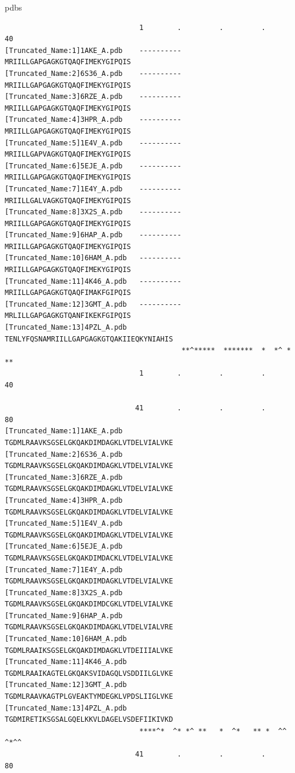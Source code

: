 \documentclass[
  letterpaper,
  DIV=11,
  numbers=noendperiod]{scrartcl}
\newenvironment{Shaded}{\begin{snugshade}}{\end{snugshade}}
\newcommand{\NormalTok}[1]{\textcolor[rgb]{0.00,0.23,0.31}{#1}}
\begin{document}
\begin{Shaded}
\begin{Highlighting}[]
\NormalTok{pdbs}
\end{Highlighting}
\end{Shaded}

\begin{verbatim}
                                1        .         .         .         40 
[Truncated_Name:1]1AKE_A.pdb    ----------MRIILLGAPGAGKGTQAQFIMEKYGIPQIS
[Truncated_Name:2]6S36_A.pdb    ----------MRIILLGAPGAGKGTQAQFIMEKYGIPQIS
[Truncated_Name:3]6RZE_A.pdb    ----------MRIILLGAPGAGKGTQAQFIMEKYGIPQIS
[Truncated_Name:4]3HPR_A.pdb    ----------MRIILLGAPGAGKGTQAQFIMEKYGIPQIS
[Truncated_Name:5]1E4V_A.pdb    ----------MRIILLGAPVAGKGTQAQFIMEKYGIPQIS
[Truncated_Name:6]5EJE_A.pdb    ----------MRIILLGAPGAGKGTQAQFIMEKYGIPQIS
[Truncated_Name:7]1E4Y_A.pdb    ----------MRIILLGALVAGKGTQAQFIMEKYGIPQIS
[Truncated_Name:8]3X2S_A.pdb    ----------MRIILLGAPGAGKGTQAQFIMEKYGIPQIS
[Truncated_Name:9]6HAP_A.pdb    ----------MRIILLGAPGAGKGTQAQFIMEKYGIPQIS
[Truncated_Name:10]6HAM_A.pdb   ----------MRIILLGAPGAGKGTQAQFIMEKYGIPQIS
[Truncated_Name:11]4K46_A.pdb   ----------MRIILLGAPGAGKGTQAQFIMAKFGIPQIS
[Truncated_Name:12]3GMT_A.pdb   ----------MRLILLGAPGAGKGTQANFIKEKFGIPQIS
[Truncated_Name:13]4PZL_A.pdb   TENLYFQSNAMRIILLGAPGAGKGTQAKIIEQKYNIAHIS
                                          **^*****  *******  *  *^ *  ** 
                                1        .         .         .         40 

                               41        .         .         .         80 
[Truncated_Name:1]1AKE_A.pdb    TGDMLRAAVKSGSELGKQAKDIMDAGKLVTDELVIALVKE
[Truncated_Name:2]6S36_A.pdb    TGDMLRAAVKSGSELGKQAKDIMDAGKLVTDELVIALVKE
[Truncated_Name:3]6RZE_A.pdb    TGDMLRAAVKSGSELGKQAKDIMDAGKLVTDELVIALVKE
[Truncated_Name:4]3HPR_A.pdb    TGDMLRAAVKSGSELGKQAKDIMDAGKLVTDELVIALVKE
[Truncated_Name:5]1E4V_A.pdb    TGDMLRAAVKSGSELGKQAKDIMDAGKLVTDELVIALVKE
[Truncated_Name:6]5EJE_A.pdb    TGDMLRAAVKSGSELGKQAKDIMDACKLVTDELVIALVKE
[Truncated_Name:7]1E4Y_A.pdb    TGDMLRAAVKSGSELGKQAKDIMDAGKLVTDELVIALVKE
[Truncated_Name:8]3X2S_A.pdb    TGDMLRAAVKSGSELGKQAKDIMDCGKLVTDELVIALVKE
[Truncated_Name:9]6HAP_A.pdb    TGDMLRAAVKSGSELGKQAKDIMDAGKLVTDELVIALVRE
[Truncated_Name:10]6HAM_A.pdb   TGDMLRAAIKSGSELGKQAKDIMDAGKLVTDEIIIALVKE
[Truncated_Name:11]4K46_A.pdb   TGDMLRAAIKAGTELGKQAKSVIDAGQLVSDDIILGLVKE
[Truncated_Name:12]3GMT_A.pdb   TGDMLRAAVKAGTPLGVEAKTYMDEGKLVPDSLIIGLVKE
[Truncated_Name:13]4PZL_A.pdb   TGDMIRETIKSGSALGQELKKVLDAGELVSDEFIIKIVKD
                                ****^*  ^* *^ **   *  ^*   ** *  ^^ ^*^^ 
                               41        .         .         .         80 


\end{verbatim}
\end{document}
